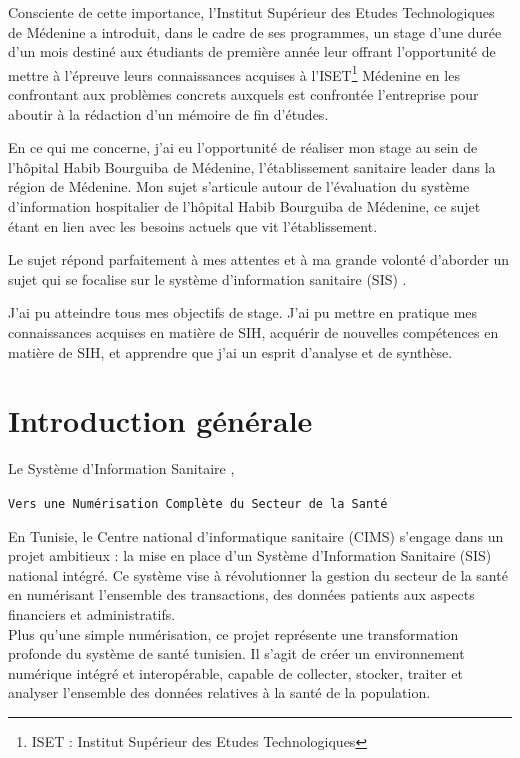 \documentclass[12pt]{rapportINPTCLOUD}
\begin{document}
	Consciente de cette importance, l’Institut Supérieur des Etudes Technologiques de Médenine a introduit, dans le cadre de ses programmes, un stage d’une durée d’un mois destiné aux étudiants de première année leur offrant l’opportunité de mettre à l’épreuve leurs connaissances acquises à l’ISET\footnote{ISET : Institut Supérieur des Etudes Technologiques} Médenine en les confrontant aux problèmes concrets auxquels est confrontée l’entreprise pour aboutir à la rédaction d’un mémoire de fin d’études.
	
	En ce qui me concerne, j’ai eu l’opportunité de réaliser mon stage au sein de l’hôpital Habib Bourguiba de Médenine, l’établissement sanitaire leader dans la région de Médenine.
	Mon sujet s’articule autour de l’évaluation du système d’information hospitalier de l’hôpital Habib Bourguiba de Médenine, ce sujet étant en lien avec les besoins actuels que vit l’établissement.
	
	Le sujet répond parfaitement à mes attentes et à ma grande volonté d’aborder un sujet qui se focalise sur le système d’information sanitaire (SIS) . 
	
	J’ai pu atteindre tous mes objectifs de stage. J’ai pu mettre en pratique mes connaissances acquises en matière de SIH, acquérir de nouvelles compétences en matière de SIH, et apprendre que j’ai un esprit d’analyse et de synthèse.
	\newpage
	\setcounter{page}{1}
	\chapter*{Introduction générale}
		\begin{center}

		Le Système d'Information Sanitaire ,
	\end{center}
	\begin{center}
		\texttt{Vers une Numérisation Complète du Secteur de la Santé}
	\end{center} 
	
	En Tunisie, le Centre national d'informatique sanitaire (CIMS) s'engage dans un projet ambitieux : la mise en place d'un Système d'Information Sanitaire (SIS) national intégré. Ce système vise à révolutionner la gestion du secteur de la santé en numérisant l'ensemble des transactions, des données patients aux aspects financiers et administratifs.\\
	
	Plus qu'une simple numérisation, ce projet représente une transformation profonde du système de santé tunisien. Il s'agit de créer un environnement numérique intégré et interopérable, capable de collecter, stocker, traiter et analyser l'ensemble des données relatives à la santé de la population.\\
	
\end{document}
